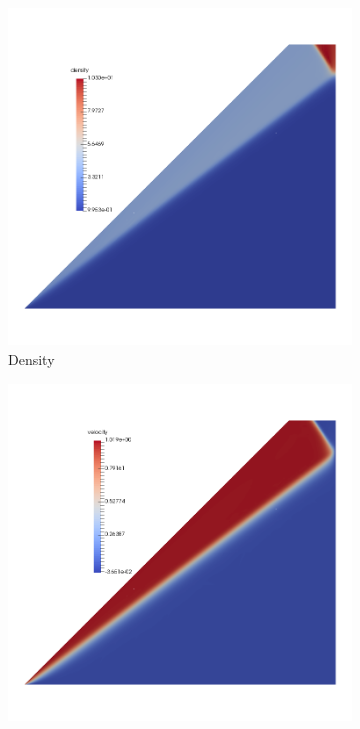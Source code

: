 \documentclass[Dissertation.tex]{subfiles}
\begin{document}
\begin{figure}[!ht]
\centering
\begin{subfigure}[t]{0.45\textwidth}
\centering
\includegraphics[width=\textwidth]{Piston/Piston_density.png}
\caption{Density}
\end{subfigure}
\begin{subfigure}[t]{0.45\textwidth}
\centering
\includegraphics[width=\textwidth]{Piston/Piston_velocity.png}

\end{subfigure}
\end{figure}
\end{document}
